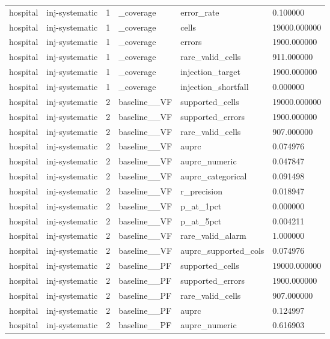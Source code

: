 \begin{tabular}{llllll}
hospital & inj-systematic & 1 & \_coverage & error\_rate & 0.100000 \\
hospital & inj-systematic & 1 & \_coverage & cells & 19000.000000 \\
hospital & inj-systematic & 1 & \_coverage & errors & 1900.000000 \\
hospital & inj-systematic & 1 & \_coverage & rare\_valid\_cells & 911.000000 \\
hospital & inj-systematic & 1 & \_coverage & injection\_target & 1900.000000 \\
hospital & inj-systematic & 1 & \_coverage & injection\_shortfall & 0.000000 \\
hospital & inj-systematic & 2 & baseline\_\_VF & supported\_cells & 19000.000000 \\
hospital & inj-systematic & 2 & baseline\_\_VF & supported\_errors & 1900.000000 \\
hospital & inj-systematic & 2 & baseline\_\_VF & rare\_valid\_cells & 907.000000 \\
hospital & inj-systematic & 2 & baseline\_\_VF & auprc & 0.074976 \\
hospital & inj-systematic & 2 & baseline\_\_VF & auprc\_numeric & 0.047847 \\
hospital & inj-systematic & 2 & baseline\_\_VF & auprc\_categorical & 0.091498 \\
hospital & inj-systematic & 2 & baseline\_\_VF & r\_precision & 0.018947 \\
hospital & inj-systematic & 2 & baseline\_\_VF & p\_at\_1pct & 0.000000 \\
hospital & inj-systematic & 2 & baseline\_\_VF & p\_at\_5pct & 0.004211 \\
hospital & inj-systematic & 2 & baseline\_\_VF & rare\_valid\_alarm & 1.000000 \\
hospital & inj-systematic & 2 & baseline\_\_VF & auprc\_supported\_cols & 0.074976 \\
hospital & inj-systematic & 2 & baseline\_\_PF & supported\_cells & 19000.000000 \\
hospital & inj-systematic & 2 & baseline\_\_PF & supported\_errors & 1900.000000 \\
hospital & inj-systematic & 2 & baseline\_\_PF & rare\_valid\_cells & 907.000000 \\
hospital & inj-systematic & 2 & baseline\_\_PF & auprc & 0.124997 \\
hospital & inj-systematic & 2 & baseline\_\_PF & auprc\_numeric & 0.616903 \\

\end{tabular}
